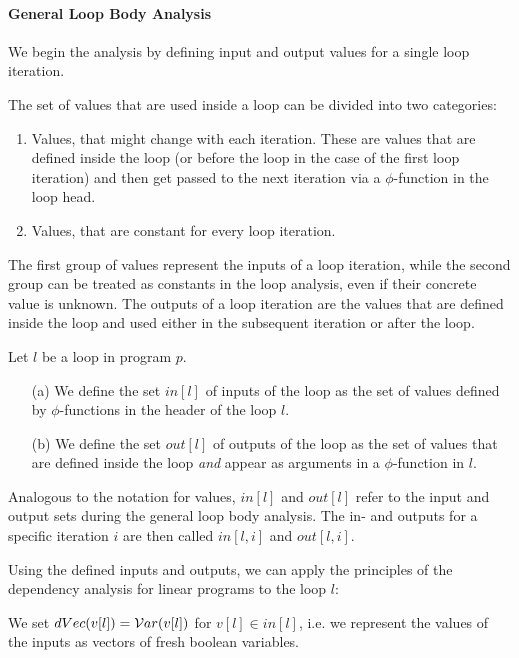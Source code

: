 \paragraph{General Loop Body Analysis}
We begin the analysis by defining input and output values for a single loop iteration. 

The set of values that are used inside a loop can be divided into two categories:
\begin{enumerate}
    \item Values, that might change with each iteration. These are values that are defined inside the loop (or before the loop in the case of the first loop iteration) and then get passed to the next iteration via a $\phi$-function in the loop head.
    \item Values, that are constant for every loop iteration.
\end{enumerate}

The first group of values represent the inputs of a loop iteration, while the second group can be treated as constants in the loop analysis, even if their concrete value is unknown. The outputs of a loop iteration are the values that are defined inside the loop and used either in the subsequent iteration or after the loop.

\begin{definition}
    Let $l$ be a loop in program $p$.
    \begin{itemize}
        \item[(a)] We define the set $in[l]$ of inputs of the loop as the set of values defined by $\phi$-functions in the header of the loop $l$.
        \item[(b)] We define the set $out[l]$ of outputs of the loop as the set of values that are defined inside the loop \emph{and} appear as arguments in a $\phi$-function in $l$.
    \end{itemize}
\end{definition}

Analogous to the notation for values, $in[l]$ and $out[l]$ refer to the input and output sets during the general loop body analysis. The in- and outputs for a specific iteration $i$ are then called $in[l, i]$ and $out[l, i]$.

Using the defined inputs and outputs, we can apply the principles of the dependency analysis for linear programs to the loop $l$:

We set $dVec(v[l]) = \mathcal{V}ar(v[l])$ for $v[l] \in in[l]$, i.e. we represent the values of the inputs as vectors of fresh boolean variables.

